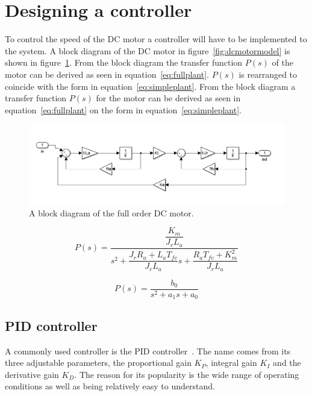 \section{Designing a controller}
\label{sec:controller}


To control the speed of the DC motor a controller will have to be implemented to the system. A block diagram of the DC motor in figure~\ref{fig:dcmotormodel} is shown in figure~\ref{fig:dcblock}. From the block diagram the transfer function $P(s)$ of the motor can be derived as seen in equation~\ref{eq:fullplant}. $P(s)$ is rearranged to coincide with the form in equation~\ref{eq:simpleplant}. From the block diagram a transfer function $P(s)$ for the motor can be derived as seen in equation~\ref{eq:fullplant} on the form in equation~\ref{eq:simpleplant}.

\begin{figure}[!h]
	\centering
	\includegraphics[width=1\linewidth]{graphics/dcblockdiagram}
	\caption{A block diagram of the full order DC motor.}
	\label{fig:dcblock}
\end{figure}


\begin{equation}
\label{eq:fullplant}
P(s) = \dfrac{\dfrac{K_m}{J_r L_a}}{s^2 + \dfrac{J_r R_a + L_a T_{fv}}{J_r L_a}s + \dfrac{R_a T_{fv} +K_m^2}{J_r L_a}}
\end{equation}

\begin{equation}
\label{eq:simpleplant}
P(s) = \dfrac{b_0}{s^2 + a_1 s + a_0}
\end{equation}


\subsection{PID controller}
 A commonly used controller is the PID controller~\cite{feedback}. 
 The name comes from its three adjustable parameters, the proportional gain $K_{P}$, integral gain $K_{I}$ and the derivative gain $K_{D}$. 
 The reason for its popularity is the wide range of operating conditions as well as being relatively easy to understand. 
 
